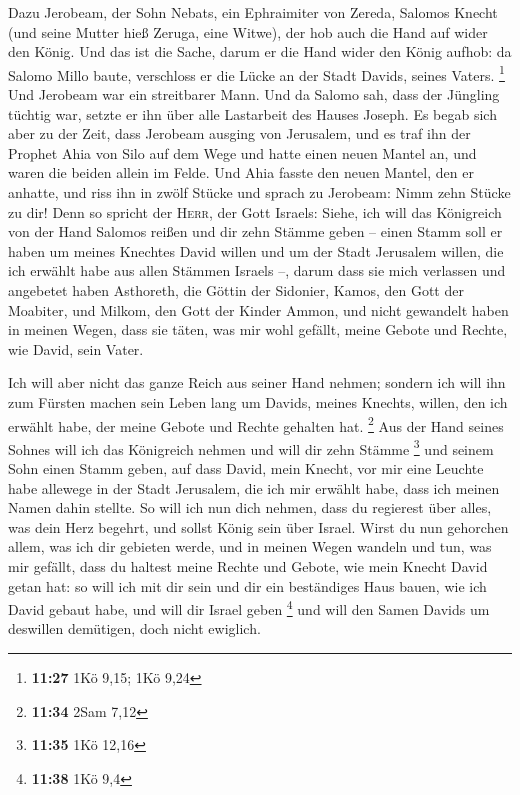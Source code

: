  Dazu Jerobeam, der Sohn Nebats, ein Ephraimiter von
Zereda, Salomos Knecht (und seine Mutter hieß Zeruga, eine Witwe), der
hob auch die Hand auf wider den König.  Und das ist die
Sache, darum er die Hand wider den König aufhob: da Salomo Millo baute,
verschloss er die Lücke an der Stadt Davids, seines Vaters. \footnote{\textbf{11:27}
  1Kö 9,15; 1Kö 9,24}  Und Jerobeam war ein streitbarer
Mann. Und da Salomo sah, dass der Jüngling tüchtig war, setzte er ihn
über alle Lastarbeit des Hauses Joseph.  Es begab sich
aber zu der Zeit, dass Jerobeam ausging von Jerusalem, und es traf ihn
der Prophet Ahia von Silo auf dem Wege und hatte einen neuen Mantel an,
und waren die beiden allein im Felde.  Und Ahia fasste
den neuen Mantel, den er anhatte, und riss ihn in zwölf Stücke
 und sprach zu Jerobeam: Nimm zehn Stücke zu dir! Denn so
spricht der \textsc{Herr}, der Gott Israels: Siehe, ich will das
Königreich von der Hand Salomos reißen und dir zehn Stämme geben --
 einen Stamm soll er haben um meines Knechtes David
willen und um der Stadt Jerusalem willen, die ich erwählt habe aus allen
Stämmen Israels --,  darum dass sie mich verlassen und
angebetet haben Asthoreth, die Göttin der Sidonier, Kamos, den Gott der
Moabiter, und Milkom, den Gott der Kinder Ammon, und nicht gewandelt
haben in meinen Wegen, dass sie täten, was mir wohl gefällt, meine
Gebote und Rechte, wie David, sein Vater.

 Ich will aber nicht das ganze Reich aus seiner Hand
nehmen; sondern ich will ihn zum Fürsten machen sein Leben lang um
Davids, meines Knechts, willen, den ich erwählt habe, der meine Gebote
und Rechte gehalten hat. \footnote{\textbf{11:34} 2Sam 7,12}
 Aus der Hand seines Sohnes will ich das Königreich
nehmen und will dir zehn Stämme \footnote{\textbf{11:35} 1Kö 12,16}
 und seinem Sohn einen Stamm geben, auf dass David, mein
Knecht, vor mir eine Leuchte habe allewege in der Stadt Jerusalem, die
ich mir erwählt habe, dass ich meinen Namen dahin stellte.
 So will ich nun dich nehmen, dass du regierest über
alles, was dein Herz begehrt, und sollst König sein über Israel.
 Wirst du nun gehorchen allem, was ich dir gebieten
werde, und in meinen Wegen wandeln und tun, was mir gefällt, dass du
haltest meine Rechte und Gebote, wie mein Knecht David getan hat: so
will ich mit dir sein und dir ein beständiges Haus bauen, wie ich David
gebaut habe, und will dir Israel geben \footnote{\textbf{11:38} 1Kö 9,4}
 und will den Samen Davids um deswillen demütigen, doch
nicht ewiglich.

